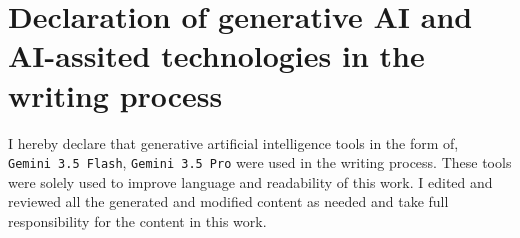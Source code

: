 \chapter*{Declaration of generative AI and
AI-assited technologies in the writing
process}

I hereby declare that generative artificial intelligence {tools} in the form of, \texttt{Gemini~3.5~Flash}, \texttt{Gemini~3.5~Pro} were used in the writing process.
These tools were solely used to improve language and readability of this work.
I edited and reviewed all the generated and modified content as needed and take full responsibility for the content in this work.